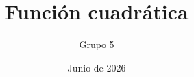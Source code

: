 \title{Función cuadrática}
\author{Grupo 5}
\date{Junio de 2026}

\begin{frame}[plain]
  \titlepage
\end{frame}
